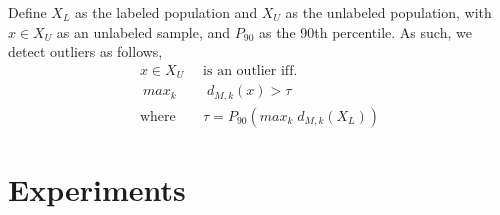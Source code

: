 \documentclass[10pt,twocolumn,letterpaper]{article}
\begin{document}

Define $X_L$ as the labeled population and $X_U$ as the unlabeled population, with $x \in X_U$ as an unlabeled sample, and $P_{90}$ as the 90th percentile. 
As such, we detect outliers as follows,
\begin{equation}
	\begin{aligned}
		x \in X_U \;\; & \text{is an outlier iff.} \\\
		\textit{max}_k & \; d_{M,k}(x) > \tau \\
		\text{where} \;\; & \tau = P_{90}\left(\textit{max}_k \; d_{M,k}\left(X_L\right)\right)
	\end{aligned}
\end{equation}




\section{Experiments}
\end{document}
